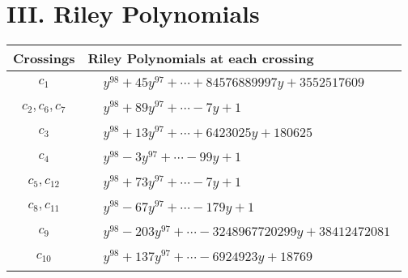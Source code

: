 \documentclass[1p]{elsarticle_modified}
\theoremstyle{definition}
\begin{document}
\centering \section*{ III. Riley Polynomials}
\begin{tabular}{m{50pt}|m{274pt}}
Crossings & \hspace{64pt}Riley Polynomials at each crossing \\
\hline $$\begin{aligned}c_{1}\end{aligned}$$&$\begin{aligned}
&y^{98}+45 y^{97}+\cdots+84576889997 y+3552517609
\end{aligned}$\\
\hline $$\begin{aligned}c_{2},c_{6},c_{7}\end{aligned}$$&$\begin{aligned}
&y^{98}+89 y^{97}+\cdots-7 y+1
\end{aligned}$\\
\hline $$\begin{aligned}c_{3}\end{aligned}$$&$\begin{aligned}
&y^{98}+13 y^{97}+\cdots+6423025 y+180625
\end{aligned}$\\
\hline $$\begin{aligned}c_{4}\end{aligned}$$&$\begin{aligned}
&y^{98}-3 y^{97}+\cdots-99 y+1
\end{aligned}$\\
\hline $$\begin{aligned}c_{5},c_{12}\end{aligned}$$&$\begin{aligned}
&y^{98}+73 y^{97}+\cdots-7 y+1
\end{aligned}$\\
\hline $$\begin{aligned}c_{8},c_{11}\end{aligned}$$&$\begin{aligned}
&y^{98}-67 y^{97}+\cdots-179 y+1
\end{aligned}$\\
\hline $$\begin{aligned}c_{9}\end{aligned}$$&$\begin{aligned}
&y^{98}-203 y^{97}+\cdots-3248967720299 y+38412472081
\end{aligned}$\\
\hline $$\begin{aligned}c_{10}\end{aligned}$$&$\begin{aligned}
&y^{98}+137 y^{97}+\cdots-6924923 y+18769
\end{aligned}$\\
\hline
\end{tabular}
\vskip 2pc
\end{document}
